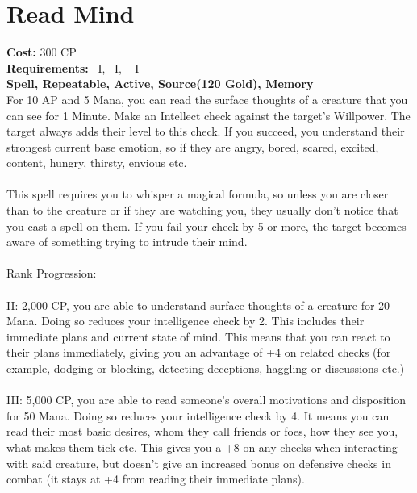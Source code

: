 \section{Read Mind}\label{spell:readMind}
\textbf{Cost:} 300 CP\\
\textbf{Requirements:}~ I,~ I, ~ I\\
\textbf{Spell, Repeatable, Active, Source(120 Gold), Memory}\\
For 10 AP and 5 Mana, you can read the surface thoughts of a creature that you can see for 1 Minute.
Make an Intellect check against the target's Willpower.
The target always adds their level to this check.
If you succeed, you understand their strongest current base emotion, so if they are angry, bored, scared, excited, content, hungry, thirsty, envious etc.\\
\\
This spell requires you to whisper a magical formula, so unless you are closer than  to the creature or if they are watching you, they usually don't notice that you cast a spell on them.
If you fail your check by 5 or more, the target becomes aware of something trying to intrude their mind.\\
\\
Rank Progression:\\
\\
II: 2,000 CP, you are able to understand surface thoughts of a creature for 20 Mana.
Doing so reduces your intelligence check by 2.
This includes their immediate plans and current state of mind.
This means that you can react to their plans immediately, giving you an advantage of +4 on related checks (for example, dodging or blocking, detecting deceptions, haggling or discussions etc.)\\
\\
III: 5,000 CP, you are able to read someone's overall motivations and disposition for 50 Mana.
Doing so reduces your intelligence check by 4.
It means you can read their most basic desires, whom they call friends or foes, how they see you, what makes them tick etc.
This gives you a +8 on any checks when interacting with said creature, but doesn't give an increased bonus on defensive checks in combat (it stays at +4 from reading their immediate plans).\\